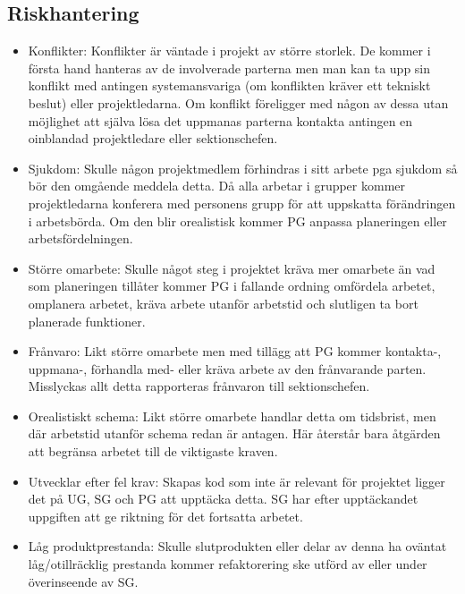 \documentclass[paper=a4, fontsize=11pt,twoside]{article}
\begin{document}
\subsection*{Riskhantering}
\begin{itemize}
\item Konflikter: 
Konflikter är väntade i projekt av större storlek. De kommer i första hand hanteras av de involverade parterna men man kan ta upp sin konflikt med antingen systemansvariga (om konflikten kräver ett tekniskt beslut) eller projektledarna. Om konflikt föreligger med någon av dessa utan möjlighet att själva lösa det uppmanas parterna kontakta antingen en oinblandad projektledare eller sektionschefen.

\item Sjukdom:
Skulle någon projektmedlem förhindras i sitt arbete pga sjukdom så bör den omgående meddela detta. Då alla arbetar i grupper kommer projektledarna konferera med personens grupp för att uppskatta förändringen i arbetsbörda. Om den blir orealistisk kommer PG anpassa planeringen eller arbetsfördelningen.

\item Större omarbete:
Skulle något steg i projektet kräva mer omarbete än vad som planeringen tillåter kommer PG i fallande ordning omfördela arbetet, omplanera arbetet, kräva arbete utanför arbetstid och slutligen ta bort planerade funktioner.

\item Frånvaro:
Likt större omarbete men med tillägg att PG kommer kontakta-, uppmana-, förhandla med- eller kräva arbete av den frånvarande parten. Misslyckas allt detta rapporteras frånvaron till sektionschefen.

\item Orealistiskt schema:
Likt större omarbete handlar detta om tidsbrist, men där arbetstid utanför schema redan är antagen. Här återstår bara åtgärden att begränsa arbetet till de viktigaste kraven.

\item Utvecklar efter fel krav:
Skapas kod som inte är relevant för projektet ligger det på UG, SG och PG att upptäcka detta. SG har efter upptäckandet uppgiften att ge riktning för det fortsatta arbetet.

\item Låg produktprestanda:
Skulle slutprodukten eller delar av denna ha oväntat låg/otillräcklig prestanda kommer refaktorering ske utförd av eller under överinseende av SG. 


\end{itemize}
\end{document}

